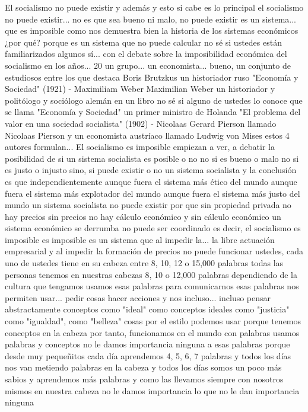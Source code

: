El socialismo no puede existir
y además y esto si cabe es lo principal el socialismo no puede existir...
no es que sea bueno ni malo, no puede existir es un sistema...
que es imposible como nos demuestra bien la historia de los sistemas económicos ¿por qué? porque es un sistema que no puede calcular
no sé si ustedes están familiarizados algunos sí... con el debate sobre la imposibilidad económica del socialismo
en los años... 20 un grupo... un economista...
bueno, un conjunto de estudiosos entre los que destaca Boris Brutzkus un historiador ruso
"Economía y Sociedad" (1921) - Maximiliam Weber
Maximilian Weber un historiador y politólogo y sociólogo alemán
en un libro no sé si alguno de ustedes lo conoce que se llama "Economía y Sociedad" un primer ministro de Holanda
"El problema del valor en una sociedad socialista" (1902) - Nicolaas Gerard Pierson
llamado Nicolaas Pierson y un economista austríaco llamado Ludwig von Mises estos 4 autores formulan...
El socialismo es imposible
empiezan a ver, a debatir la posibilidad de si un sistema socialista
es posible o no no si es bueno o malo no si es justo o injusto sino, si puede existir o no
un sistema socialista y la conclusión es que independientemente aunque fuera el sistema más ético del mundo aunque fuera el sistema más explotador del mundo
aunque fuera el sistema más justo del mundo un sistema socialista no puede existir por que sin propiedad privada
no hay precios sin precios no hay cálculo económico y sin cálculo económico
un sistema económico se derrumba no puede ser coordinado es decir, el socialismo es imposible
es imposible es un sistema que al impedir la... la libre actuación empresarial
y al impedir la formación de precios no puede funcionar ustedes, cada uno de ustedes
tiene en su cabeza entre 8, 10, 12 o 15,000 palabras todas las personas tenemos en nuestras cabezas
8, 10 o 12,000 palabras dependiendo de la cultura que tengamos usamos esas palabras para comunicarnos
esas palabras nos permiten usar... pedir cosas hacer acciones y nos incluso... incluso pensar abstractamente
conceptos como "ideal" como conceptos ideales como "justicia" como "igualdad", como "belleza"
cosas por el estilo podemos usar porque tenemos conceptos en la cabeza por tanto, funcionamos en el mundo con palabras usamos palabras y conceptos
no le damos importancia ninguna a esas palabras porque desde muy pequeñitos cada día aprendemos 4, 5, 6, 7 palabras
y todos los días nos van metiendo palabras en la cabeza y todos los días somos un poco más sabios y aprendemos más palabras
y como las llevamos siempre con nosotros mismos en nuestra cabeza no le damos importancia lo que no le dan importancia ninguna
